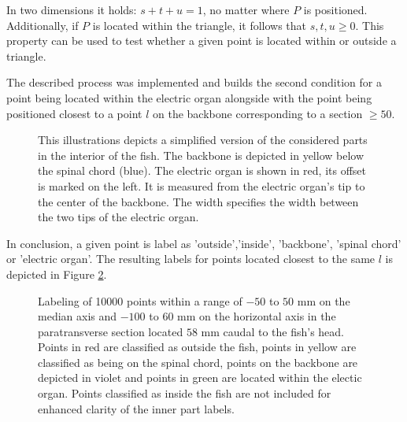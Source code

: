  In two dimensions it holds: $s+t+u = 1$, no matter where $P$ is positioned. Additionally, if $P$ is located within the triangle, it follows that $s,t,u \geq 0$. This property can be used to test whether a given point is located within or outside a triangle.
 
The described process was implemented and builds the second condition for a point being located within the electric organ alongside with the point being positioned closest to a point $l$ on the backbone corresponding to a section $\geq 50$. 

\begin{figure}
    \centering
    \caption{This illustrations depicts a simplified version of the considered parts in the interior of the fish. The backbone is depicted in yellow below the spinal chord (blue). The electric organ is shown in red, its offset is marked on the left. It is measured from the electric organ's tip to the center of the backbone. The width specifies the width between the two tips of the electric organ.}
    \label{fig:innerparts}
\end{figure}

In conclusion, a given point is label as 'outside','inside', 'backbone', 'spinal chord' or 'electric organ'. The resulting labels for points located closest to the same $l$ is depicted in Figure \ref{fig:sectionlabel}.

\begin{figure}
    \centering
    
    \caption{Labeling of 10000 points within a range of $-50$ to $50$ mm on the median axis and $-100$ to $60$ mm on the horizontal axis in the paratransverse section located $58$ mm caudal to the fish's head. Points in red are classified as outside the fish, points in yellow are classified as being on the spinal chord, points on the backbone are depicted in violet and points in green are located within the electic organ. Points classified as inside the fish are not included for enhanced clarity of the inner part labels.}
    \label{fig:sectionlabel}
\end{figure}







